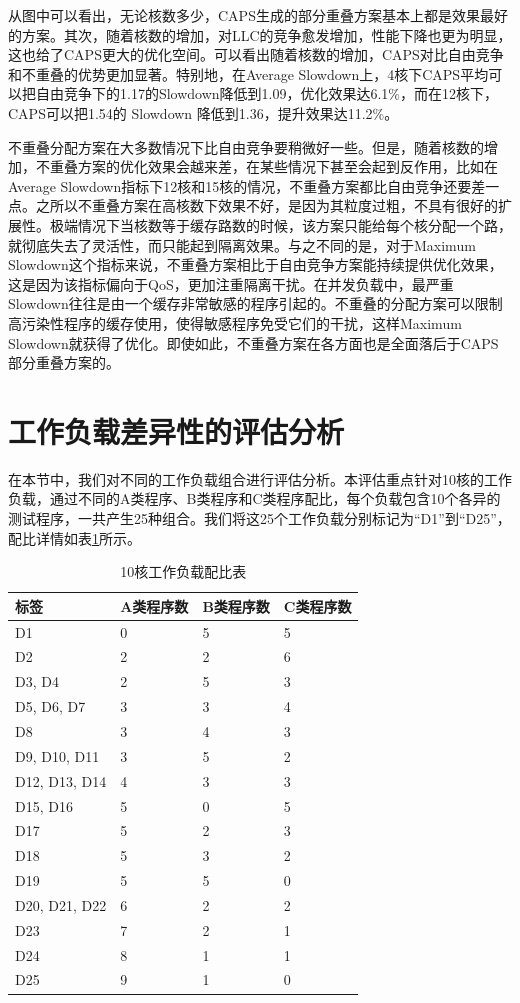 从图中可以看出，无论核数多少，CAPS生成的部分重叠方案基本上都是效果最好的方案。其次，随着核数的增加，对LLC的竞争愈发增加，性能下降也更为明显，这也给了CAPS更大的优化空间。可以看出随着核数的增加，CAPS对比自由竞争和不重叠的优势更加显著。特别地，在Average Slowdown上，4核下CAPS平均可以把自由竞争下的1.17的Slowdown降低到1.09，优化效果达6.1\%，而在12核下，CAPS可以把1.54的 Slowdown 降低到1.36，提升效果达11.2\%。

不重叠分配方案在大多数情况下比自由竞争要稍微好一些。但是，随着核数的增加，不重叠方案的优化效果会越来差，在某些情况下甚至会起到反作用，比如在Average Slowdown指标下12核和15核的情况，不重叠方案都比自由竞争还要差一点。之所以不重叠方案在高核数下效果不好，是因为其粒度过粗，不具有很好的扩展性。极端情况下当核数等于缓存路数的时候，该方案只能给每个核分配一个路，就彻底失去了灵活性，而只能起到隔离效果。与之不同的是，对于Maximum Slowdown这个指标来说，不重叠方案相比于自由竞争方案能持续提供优化效果，这是因为该指标偏向于QoS，更加注重隔离干扰。在并发负载中，最严重Slowdown往往是由一个缓存非常敏感的程序引起的。不重叠的分配方案可以限制高污染性程序的缓存使用，使得敏感程序免受它们的干扰，这样Maximum Slowdown就获得了优化。即使如此，不重叠方案在各方面也是全面落后于CAPS部分重叠方案的。

\section{工作负载差异性的评估分析}

在本节中，我们对不同的工作负载组合进行评估分析。本评估重点针对10核的工作负载，通过不同的A类程序、B类程序和C类程序配比，每个负载包含10个各异的测试程序，一共产生25种组合。我们将这25个工作负载分别标记为“D1”到“D25”，配比详情如表\ref{tab:10w}所示。


\begin{table}[htbp]
\caption{10核工作负载配比表}
\label{tab:10w}
\centering
\begin{tabularx} {0.8\linewidth}{|X|l|l|l| } 
 \hline
 标签 & A类程序数 & B类程序数 & C类程序数 \\
 \hline
D1 & 0 & 5 & 5 \\
\hline 
D2 & 2 & 2 & 6 \\
\hline 
D3, D4 & 2 & 5 & 3 \\
\hline 
D5, D6, D7 & 3 & 3 & 4 \\
\hline 
D8 & 3 & 4 & 3 \\
\hline 
D9, D10, D11 & 3 & 5 & 2 \\
\hline 
D12, D13, D14 & 4 & 3 & 3 \\
\hline 
D15, D16 & 5 & 0 & 5 \\
\hline 
D17 & 5 & 2 & 3 \\
\hline 
D18 & 5 & 3 & 2 \\
\hline 
D19 & 5 & 5 & 0 \\
\hline 
D20, D21, D22 & 6 & 2 & 2 \\
\hline 
D23 & 7 & 2 & 1 \\
\hline 
D24 & 8 & 1 & 1 \\
\hline 
D25 & 9 & 1 & 0 \\
\hline 
\end{tabularx}
\end{table}


